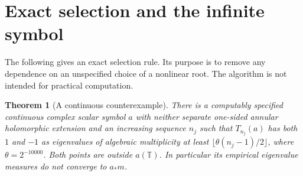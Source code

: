 \documentclass[11pt]{article}
\newtheorem{theorem}[proposition]{Theorem}
\newcommand{\T}{\mathbb T}
\begin{document}
\section{Exact selection and the infinite symbol}
The following gives an exact selection rule. Its purpose is to remove
any dependence on an unspecified choice of a nonlinear root. The
algorithm is not intended for practical computation.

\begin{theorem}[A continuous counterexample]
\label{thm:counterexample}
There is a computably specified continuous complex scalar symbol $a$
with neither separate one-sided annular holomorphic extension and an
increasing sequence $n_j$ such that $T_{n_j}(a)$ has both $1$ and $-1$
as eigenvalues of algebraic multiplicity at least
$\lfloor\theta(n_j-1)/2\rfloor$, where $\theta=2^{-10000}$.
Both points are outside $a(\T)$. In particular its empirical
eigenvalue measures do not converge to $a_*m$.
\end{theorem}
\end{document}
